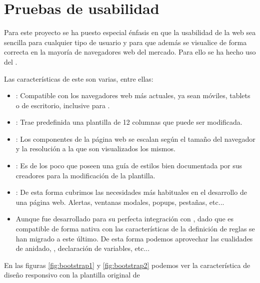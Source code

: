 \section{Pruebas de usabilidad}
Para este proyecto se ha puesto especial énfasis en que la usabilidad de la web
sea sencilla para cualquier tipo de usuario y para que además se visualice de
forma correcta en la mayoría de navegadores web del mercado. Para ello se ha
hecho uso del  
\cite{prog:twitter_bootstrap}.

Las características de este  son varias, entre ellas:

\begin{itemize}
\item {}: Compatible con los navegadores web más
  actuales, ya sean móviles, tablets o de escritorio, inclusive para
  .
\item {}: Trae predefinida una plantilla de 12
  columnas que puede ser modificada.
\item {}: Los componentes de la página web se escalan
  según el tamaño del navegador y la resolución a la que son visualizados los
  mismos.
\item {}: Es de los poco  que poseen una guía de estilos bien documentada por sus creadores para
  la modificación de la plantilla.
\item {}: De esta forma cubrimos las
  necesidades más habituales en el desarrollo de una página web. Alertas,
  ventanas modales, popups, pestañas, etc...
\item {} Aunque 
  fue desarrollado para su perfecta integración con , dado que
   es compatible de forma nativa con  las
  características de la definición de reglas se han migrado a este último. De
  esta forma podemos aprovechar las cualidades de anidado, ,
  declaración de variables, etc...
\end{itemize}

En las figuras \ref{fig:bootstrap1} y \ref{fig:bootstrap2} podemos ver la
característica de diseño responsivo con la plantilla original de

\newpage {}


